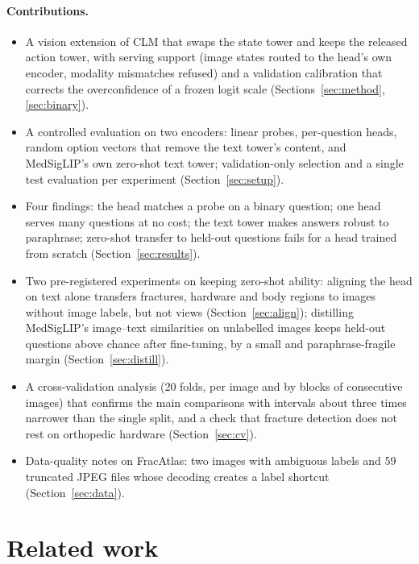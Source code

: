 \documentclass[11pt]{article}
\begin{document}
\paragraph{Contributions.}
\begin{itemize}
  \item A vision extension of CLM that swaps the state tower and keeps the released action tower, with serving
        support (image states routed to the head's own encoder, modality mismatches refused) and a validation
        calibration that corrects the overconfidence of a frozen logit scale (Sections~\ref{sec:method},
        \ref{sec:binary}).
  \item A controlled evaluation on two encoders: linear probes, per-question heads, random option vectors that
        remove the text tower's content, and MedSigLIP's own zero-shot text tower; validation-only selection and a
        single test evaluation per experiment (Section~\ref{sec:setup}).
  \item Four findings: the head matches a probe on a binary question; one head serves many questions at no cost;
        the text tower makes answers robust to paraphrase; zero-shot transfer to held-out questions fails for a
        head trained from scratch (Section~\ref{sec:results}).
  \item Two pre-registered experiments on keeping zero-shot ability: aligning the head on text alone transfers
        fractures, hardware and body regions to images without image labels, but not views
        (Section~\ref{sec:align}); distilling MedSigLIP's image--text similarities on unlabelled images keeps
        held-out questions above chance after fine-tuning, by a small and paraphrase-fragile margin
        (Section~\ref{sec:distill}).
  \item A cross-validation analysis (20 folds, per image and by blocks of consecutive images) that confirms the
        main comparisons with intervals about three times narrower than the single split, and a check that
        fracture detection does not rest on orthopedic hardware (Section~\ref{sec:cv}).
  \item Data-quality notes on FracAtlas: two images with ambiguous labels and 59 truncated JPEG files whose
        decoding creates a label shortcut (Section~\ref{sec:data}).
\end{itemize}

\section{Related work}
\end{document}
